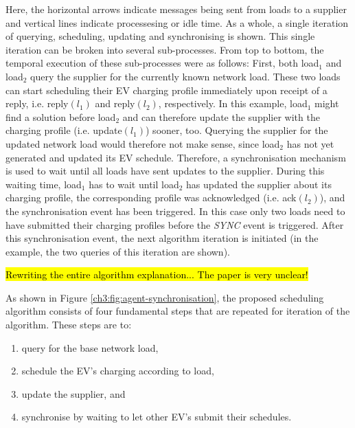 Here, the horizontal arrows indicate messages being sent from loads to a supplier and vertical lines indicate processesing or idle time. 
As a whole, a single iteration of querying, scheduling, updating and synchronising is shown.
This single iteration can be broken into several sub-processes.
From top to bottom, the temporal execution of these sub-processes were as follows:
First, both load$_1$ and load$_2$ query the supplier for the currently known network load.
These two loads can start scheduling their EV charging profile immediately upon receipt of a reply, i.e. reply$(l_1)$ and reply$(l_2)$, respectively.
In this example, load$_1$ might find a solution before load$_2$ and can therefore update the supplier with the charging profile (i.e. update$(l_1)$) sooner, too.
Querying the supplier for the updated network load would therefore not make sense, since load$_2$ has not yet generated and updated its EV schedule.
Therefore, a synchronisation mechanism is used to wait until all loads have sent updates to the supplier.
During this waiting time, load$_1$ has to wait until load$_2$ has updated the supplier about its charging profile, the corresponding profile was acknowledged (i.e. ack$(l_2)$), and the synchronisation event has been triggered.
In this case only two loads need to have submitted their charging profiles before the \textit{SYNC} event is triggered.
After this synchronisation event, the next algorithm iteration is initiated (in the example, the two queries of this iteration are shown).


\hl{Rewriting the entire algorithm explanation... The paper is very unclear!}

As shown in Figure \ref{ch3:fig:agent-synchronisation}, the proposed scheduling algorithm consists of four fundamental steps that are repeated for iteration of the algorithm.
These steps are to:

\begin{enumerate}
	\item query for the base network load,
	\item schedule the EV's charging according to load,
	\item update the supplier, and
	\item synchronise by waiting to let other EV's submit their schedules.
\end{enumerate}

